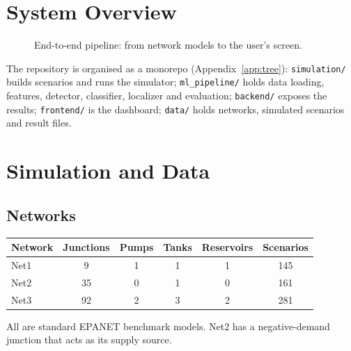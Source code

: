 \documentclass[11pt,a4paper]{article}
\newcommand{\code}[1]{\texttt{#1}}
\begin{document}
\section{System Overview}
\begin{figure}[H]\centering
{}
\caption{End-to-end pipeline: from network models to the user's screen.}\label{fig:arch}\end{figure}

The repository is organised as a monorepo (Appendix~\ref{app:tree}): \code{simulation/} builds scenarios and runs the simulator; \code{ml\_pipeline/} holds data loading, features, detector, classifier, localizer and evaluation; \code{backend/} exposes the results; \code{frontend/} is the dashboard; \code{data/} holds networks, simulated scenarios and result files.

\section{Simulation and Data}
\subsection{Networks}
\begin{center}\small\begin{tabular}{@{}lccccc@{}}\toprule
Network & Junctions & Pumps & Tanks & Reservoirs & Scenarios \\\midrule
Net1 & 9 & 1 & 1 & 1 & 145 \\
Net2 & 35 & 0 & 1 & 0 & 161 \\
Net3 & 92 & 2 & 3 & 2 & 281 \\\bottomrule\end{tabular}\end{center}
All are standard EPANET benchmark models. Net2 has a negative-demand junction that acts as its supply source.
\end{document}
